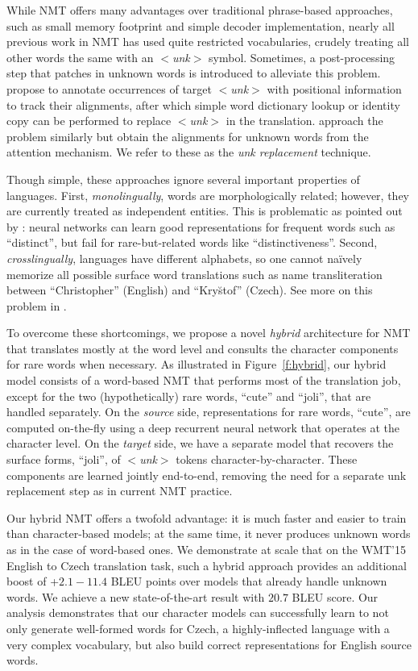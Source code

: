 \documentclass[11pt]{article}
\newcommand{\word}[1]{``#1''}
\newcommand{\unk}{$<${\it unk}$>$}
\newcommand{\ensbleu}{20.7}
\newcommand{\gain}{2.1{-}11.4}
\begin{document}
While NMT offers many advantages over traditional phrase-based approaches, such as
small memory footprint and simple decoder implementation, nearly all previous
work in NMT has used quite restricted vocabularies, crudely treating all other
words the same with an \unk{} symbol. Sometimes, a post-processing step that
patches in unknown words is introduced to alleviate this problem. %
 propose to annotate occurrences of target \unk{} with positional information to
track their alignments, after which simple word dictionary
lookup or identity copy can be performed to replace \unk{} in the translation.
 approach the problem similarly but obtain the alignments for unknown
words from the attention mechanism. We refer to these as the {\it
unk replacement} technique.

Though simple, these approaches ignore several important
properties of languages. First, {\it monolingually}, words are morphologically
related; however, they are currently treated as independent entities. This is
problematic as pointed out by
: neural networks can learn good
representations for frequent words such as \word{distinct}, but fail for
rare-but-related words like \word{distinctiveness}. Second, {\it crosslingually},
languages have different alphabets, so one cannot na\"{i}vely memorize all
possible surface word translations such as name transliteration between 
\word{Christopher} (English) and \word{Kry\u{s}tof} (Czech). See more on this problem
in \cite{sennrich16sub}.

To overcome these shortcomings, we propose a novel {\it hybrid} architecture for NMT
that translates mostly at the word level and consults the character
components for rare words when necessary. As illustrated in
Figure~\ref{f:hybrid}, our hybrid model consists of a word-based NMT that
performs most of the translation job, except for the two (hypothetically) rare words,
\word{cute} and \word{joli}, that are handled separately. On the {\it source}
side, representations for rare words, \word{cute}, are
computed on-the-fly using a deep recurrent neural network that operates at the
character level. On the {\it target} side, we have a separate model that
recovers the surface forms, \word{joli}, of \unk{} tokens character-by-character.
These components are learned jointly end-to-end, removing the need for a separate
unk replacement step as in current NMT practice.

Our hybrid NMT offers a twofold advantage: it is much faster and easier to
train than character-based models; at the same time, it never produces unknown
words as in the case of word-based ones.
We demonstrate at scale that on the WMT'15 English to
Czech translation task, such a hybrid approach provides
an additional boost of +$\gain{}$ BLEU points over models 
that already handle unknown words.
We achieve a new state-of-the-art result with
$\ensbleu{}$ BLEU score.
Our analysis demonstrates that our character models can successfully learn to not
only generate well-formed words for Czech, a
highly-inflected language with a very complex vocabulary, but also build correct
representations for English source words.
\end{document}
